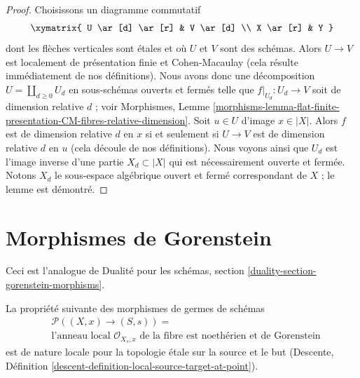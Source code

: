 \begin{proof}
Choisissons un diagramme commutatif
$$
\xymatrix{
U \ar[d] \ar[r] & V \ar[d] \\
X \ar[r] & Y
}
$$
dont les flèches verticales sont étales et où $U$ et $V$ sont des schémas.
Alors $U \to V$ est localement de présentation finie et Cohen-Macaulay
(cela résulte immédiatement de nos définitions).
Nous avons donc une décomposition $U = \coprod_{d \geq 0} U_d$
en sous-schémas ouverts et fermés telle que $f|_{U_d} : U_d \to V$
soit de dimension relative $d$ ; voir Morphismes, Lemme
\ref{morphisms-lemma-flat-finite-presentation-CM-fibres-relative-dimension}.
Soit $u \in U$ d'image $x \in |X|$. Alors
$f$ est de dimension relative $d$ en $x$ si et seulement si
$U \to V$ est de dimension relative $d$ en $u$
(cela découle de nos définitions).
Nous voyons ainsi que $U_d$ est l'image inverse
d'une partie $X_d \subset |X|$ qui est nécessairement
ouverte et fermée. Notons $X_d$ le sous-espace algébrique
ouvert et fermé correspondant de $X$ ; le lemme est démontré.
\end{proof}







\section{Morphismes de Gorenstein}
\label{section-gorenstein}

\noindent
Ceci est l'analogue de Dualité pour les schémas, section
\ref{duality-section-gorenstein-morphisms}.

\begin{lemma}
\label{lemma-gorenstein-local-ring-fibre}
La propriété suivante des morphismes de germes de schémas
\begin{align*}
& \mathcal{P}((X, x) \to (S, s)) = \\
& \text{l'anneau local }
\mathcal{O}_{X_s, x}
\text{ de la fibre est noethérien et de Gorenstein}
\end{align*}
est de nature locale pour la topologie étale sur la source et le but (Descente, Définition
\ref{descent-definition-local-source-target-at-point}).
\end{lemma}

